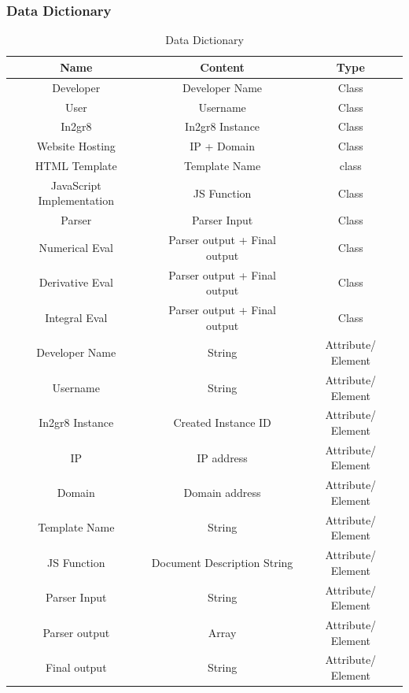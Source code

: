 \documentclass[11pt, oneside]{article}
\begin{document}
\subsubsection{Data Dictionary}
\begin{table}[H]
\caption{Data Dictionary}
\begin{center}
\begin{tabular}{|c|c|c|}
\hline
Name & Content &Type\\
\hline    
Developer & Developer Name & Class\\
\hline    
User & Username & Class\\
\hline    
In2gr8 & In2gr8 Instance & Class\\
\hline
Website Hosting & IP + Domain & Class\\
\hline    
HTML Template & Template Name & class\\
\hline
JavaScript Implementation & JS Function & Class\\
\hline    
Parser & Parser Input & Class\\
\hline    
Numerical Eval & Parser output + Final output & Class\\
\hline    
Derivative Eval & Parser output + Final output & Class\\
\hline    
Integral Eval & Parser output + Final output & Class\\
\hline    



Developer Name & String & Attribute/ Element\\
\hline
Username & String & Attribute/ Element\\
\hline
In2gr8 Instance & Created Instance ID & Attribute/ Element\\
\hline
IP & IP address & Attribute/ Element\\
\hline
Domain & Domain address & Attribute/ Element\\
\hline
Template Name & String & Attribute/ Element\\
\hline
JS Function & Document Description String & Attribute/ Element\\
\hline
Parser Input & String & Attribute/ Element\\
\hline
Parser output & Array & Attribute/ Element\\
\hline
Final output & String & Attribute/ Element\\
\hline
\end{tabular}
\end{center}
\label{default}
\end{table}%
\end{document}
